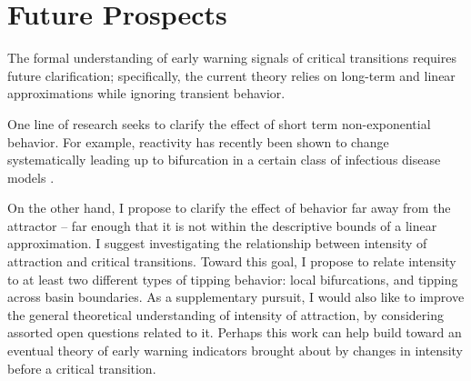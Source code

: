 \section{Future Prospects}
\label{sec:proposal}

The formal understanding of early warning signals of critical transitions requires future clarification; specifically, the current theory relies on long-term and linear approximations while ignoring transient behavior. 

One line of research seeks to clarify the effect of short term non-exponential behavior. For example, reactivity has recently been shown to change systematically leading up to bifurcation in a certain class of infectious disease models \cite{oreganTransientIndicatorsTipping2020}. 

On the other hand, I propose to clarify the effect of behavior far away from the attractor -- far enough that it is not within the descriptive bounds of a linear approximation. I suggest investigating the relationship between intensity of attraction and critical transitions. 
%
Toward this goal, I propose to relate intensity to at least two different types of tipping behavior: local bifurcations, and tipping across basin boundaries. As a supplementary pursuit, I would also like to improve the general theoretical understanding of intensity of attraction, by considering assorted open questions related to it. 
%
Perhaps this work can help build toward an eventual theory of early warning indicators brought about by changes in intensity before a critical transition. 


%



